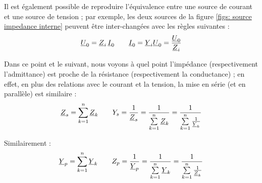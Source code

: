 \documentclass[12pt,a4paper]{article}
\newcommand{\uz}{\uline{Z} }
\newcommand{\uy}{\uline{Y} }
\newcommand{\uu}{\uline{U} }
\begin{document}
 Il est également possible de reproduire l'équivalence entre une source de courant et une source de tension ; par exemple, les deux sources de la figure \ref{figs: source impedance interne} peuvent être inter-changées avec les règles suivantes :
\begin{equation}
	\uu_0 = \uz_i \, \uline{I}_0 \qquad \uline{I}_0 = \uy_i \uu_0 = \frac{\uu_0}{\uz_i}
\end{equation}

 Dans ce point et le suivant, nous voyons à quel point l'impédance (respectivement l'admittance) est proche de la résistance (respectivement la conductance) ; en effet, en plus des relations avec le courant et la tension, la mise en série (et en parallèle) est similaire :
\begin{equation}
	\uz_s = \sum_{k=1}^n \uz_k \qquad {Y}_s = \frac{1}{\uz_s} = \frac{1}{\somme{n}{k=1}\uz_k} =  \frac{1}{\somme{n}{k=1} \frac{1}{\uy_k}}
	\label{equ: mise serie impedance/admittance}
\end{equation}

 Similairement :
\begin{equation}	
	\uy_p = \sum_{k=1}^n \uy_k \qquad {Z}_p = \frac{1}{\uy_p} = \frac{1}{\somme{n}{k=1}\uy_k} =  \frac{1}{\somme{n}{k=1} \frac{1}{\uz_k}}
	\label{equ: mise parallele impedance/admittance}
\end{equation}
\end{document}
